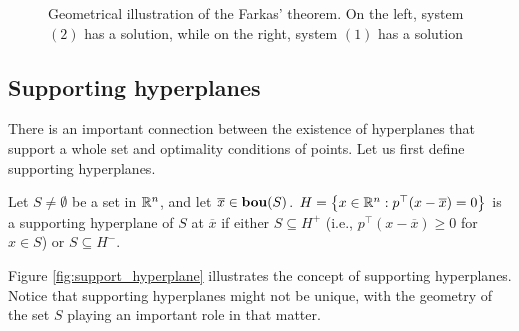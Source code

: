 \begin{figure}[h]
	\caption{Geometrical illustration of the Farkas' theorem. On the left, system $(2)$ has a solution, while on the right, system $(1)$ has a solution} \label{fig:farkas}
\end{figure}


\subsection{Supporting hyperplanes}

There is an important connection between the existence of hyperplanes that support a whole set and optimality conditions of points. Let us first define supporting hyperplanes. 

\begin{definition}
	Let $S \neq \emptyset$ be a set in $\mathbb{R}^n$, and let $\overline{x} \in \mathop{\bf bou}(S)$. $H = \left\{ x \in \mathbb{R}^n : p^\top (x-\overline{x}) =0 \right \}$ is a supporting hyperplane of $S$ at $\overline{x}$ if either $S \subseteq H^+$ (i.e., $p^\top (x-\overline{x}) \geq 0$ for $x \in S$) or $S \subseteq H^-$.  
\end{definition}

Figure \ref{fig:support_hyperplane} illustrates the concept of supporting hyperplanes. Notice that supporting hyperplanes might not be unique, with the geometry of the set $S$ playing an important role in that matter. 

